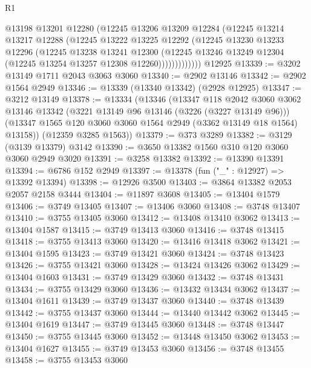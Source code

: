 \begin{lexlean}{R1}
\begin{coremodule}
                @13198
                @13201
                @12280
                (@12245
                  @13206
                  @13209
                  @12284
                  (@12245
                    @13214
                    @13217
                    @12288
                    (@12245
                      @13222
                      @13225
                      @12292
                      (@12245
                        @13230
                        @13233
                        @12296
                        (@12245
                          @13238
                          @13241
                          @12300
                          (@12245
                            @13246
                            @13249
                            @12304
                            (@12245 @13254 @13257 @12308 @12260)))))))))))))
    @12925
@13339 := @3202 @13149 @1711 @2043 @3063 @3060
@13340 := @2902 @13146
@13342 := @2902 @1564 @2949
@13346 := @13339 (@13340 @13342) (@2928 @12925)
@13347 := @3212 @13149
@13378 := @13334
    (@13346
      (@13347
        @118
        @2042
        @3060
        @3062
        @13146
        @13342
        (@3221 @13149 @96 @13146 (@3226 (@3227 @13149 @96)))
        (@13347 @1565 @120 @3060 @3060 @1564 @2949 (@3362 @13149 @18 @1564) @13158))
      (@12359 @3285 @1563))
@13379 := @373 @3289
@13382 := @3129 (@3139 @13379) @3142
@13390 := @3650 @13382 @1560 @310 @120 @3060 @3060 @2949 @3020
@13391 := @3258 @13382
@13392 := @13390 @13391
@13394 := @6786 @152 @2949
@13397 := @13378 (fun ("_" : @12927) => @13392 @13394)
@13398 := @12926 @3500
@13403 := @3864 @13382 @2053 @2057 @2158 @3444
@13404 := @11897 @3608
@13405 := @13404 @1579
@13406 := @3749 @13405
@13407 := @13406 @3060
@13408 := @3748 @13407
@13410 := @3755 @13405 @3060
@13412 := @13408 @13410 @3062
@13413 := @13404 @1587
@13415 := @3749 @13413 @3060
@13416 := @3748 @13415
@13418 := @3755 @13413 @3060
@13420 := @13416 @13418 @3062
@13421 := @13404 @1595
@13423 := @3749 @13421 @3060
@13424 := @3748 @13423
@13426 := @3755 @13421 @3060
@13428 := @13424 @13426 @3062
@13429 := @13404 @1603
@13431 := @3749 @13429 @3060
@13432 := @3748 @13431
@13434 := @3755 @13429 @3060
@13436 := @13432 @13434 @3062
@13437 := @13404 @1611
@13439 := @3749 @13437 @3060
@13440 := @3748 @13439
@13442 := @3755 @13437 @3060
@13444 := @13440 @13442 @3062
@13445 := @13404 @1619
@13447 := @3749 @13445 @3060
@13448 := @3748 @13447
@13450 := @3755 @13445 @3060
@13452 := @13448 @13450 @3062
@13453 := @13404 @1627
@13455 := @3749 @13453 @3060
@13456 := @3748 @13455
@13458 := @3755 @13453 @3060

\end{coremodule}
\end{lexlean}
